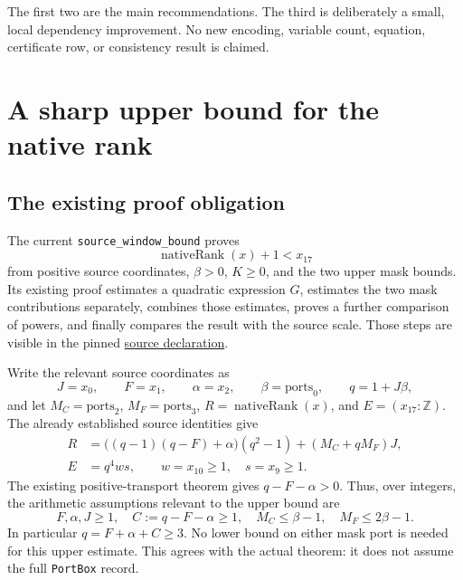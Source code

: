 \documentclass[11pt]{article}
\newcommand{\Z}{\mathbb Z}
\newcommand{\code}[1]{\nolinkurl{#1}}
\begin{document}
The first two are the main recommendations. The third is deliberately a small,
local dependency improvement. No new encoding, variable count, equation,
certificate row, or consistency result is claimed.

\section{A sharp upper bound for the native rank}

\subsection{The existing proof obligation}

The current \code{source_window_bound} proves
\[
  \operatorname{nativeRank}(x)+1 < x_{17}
\]
from positive source coordinates, $\beta>0$, $K\ge0$, and the two upper mask
bounds. Its existing proof estimates a quadratic expression $G$, estimates the
two mask contributions separately, combines those estimates, proves a further
comparison of powers, and finally compares the result with the source scale.
Those steps are visible in the pinned
\href{https://github.com/VladimirReshetnikov/ProveIt/blob/60fcb2a69b7f1fdd4c3592ea5f164223cad50abe/Computability/DiophantineConsistency/Lean/DiophantineConsistency/NativePellBootstrap.lean#L514-L563}{source declaration}.

Write the relevant source coordinates as
\[
 J=x_0,\qquad F=x_1,\qquad \alpha=x_2,\qquad
 \beta=\mathrm{ports}_0,\qquad q=1+J\beta,
\]
and let $M_C=\mathrm{ports}_2$, $M_F=\mathrm{ports}_3$,
$R=\operatorname{nativeRank}(x)$, and $E=(x_{17}:\Z)$. The already established
source identities give
\begin{align}
 R&=\bigl((q-1)(q-F)+\alpha\bigr)(q^2-1)+(M_C+qM_F)J,\label{eq:rank}\\
 E&=q^4ws,\qquad w=x_{10}\ge1,\quad s=x_9\ge1.\label{eq:scale}
\end{align}
The existing positive-transport theorem gives $q-F-\alpha>0$. Thus, over
integers, the arithmetic assumptions relevant to the upper bound are
\begin{equation}
 F,\alpha,J\ge1,\quad C:=q-F-\alpha\ge1,\quad
 M_C\le\beta-1,\quad M_F\le2\beta-1.\label{eq:box}
\end{equation}
In particular $q=F+\alpha+C\ge3$. No lower bound on either mask port is needed
for this upper estimate. This agrees with the actual theorem: it does not
assume the full \code{PortBox} record.
\end{document}
